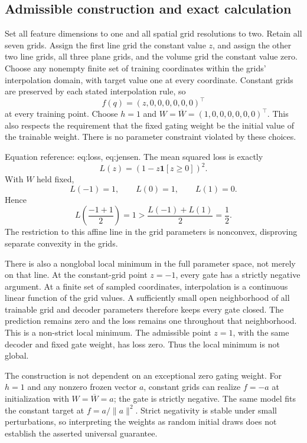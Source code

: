 \documentclass[10pt]{article}
\begin{document}
\subsection*{Admissible construction and exact calculation}
Set all feature dimensions to one and all spatial grid resolutions to two. Retain all seven grids. Assign the first line grid the constant value \(z\), and assign the other two line grids, all three plane grids, and the volume grid the constant value zero. Choose any nonempty finite set of training coordinates within the grids’ interpolation domain, with target value one at every coordinate. Constant grids are preserved by each stated interpolation rule, so \[f(q)=(z,0,0,0,0,0,0)^\top\] at every training point. Choose \(h=1\) and \(W=\overline W=(1,0,0,0,0,0,0)^\top\). This also respects the requirement that the fixed gating weight be the initial value of the trainable weight. There is no parameter constraint violated by these choices.\par
Equation reference: eq:loss, eq:jensen. The mean squared loss is exactly \[
L(z)=\left(1-z\mathbf{1}[z\geq0]\right)^2.\] With \(W\) held fixed, \[L(-1)=1,\qquad L(0)=1,\qquad L(1)=0.\] Hence \[
 L\!\left(\frac{-1+1}{2}\right)=1>
 \frac{L(-1)+L(1)}2=\frac12.\] The restriction to this affine line in the grid parameters is nonconvex, disproving separate convexity in the grids.\par
There is also a nonglobal local minimum in the full parameter space, not merely on that line. At the constant-grid point \(z=-1\), every gate has a strictly negative argument. At a finite set of sampled coordinates, interpolation is a continuous linear function of the grid values. A sufficiently small open neighborhood of all trainable grid and decoder parameters therefore keeps every gate closed. The prediction remains zero and the loss remains one throughout that neighborhood. This is a non-strict local minimum. The admissible point \(z=1\), with the same decoder and fixed gate weight, has loss zero. Thus the local minimum is not global.\par
The construction is not dependent on an exceptional zero gating weight. For \(h=1\) and any nonzero frozen vector \(a\), constant grids can realize \(f=-a\) at initialization with \(W=\overline W=a\); the gate is strictly negative. The same model fits the constant target at \(f=a/\|a\|^2\). Strict negativity is stable under small perturbations, so interpreting the weights as random initial draws does not establish the asserted universal guarantee.\par
\end{document}
